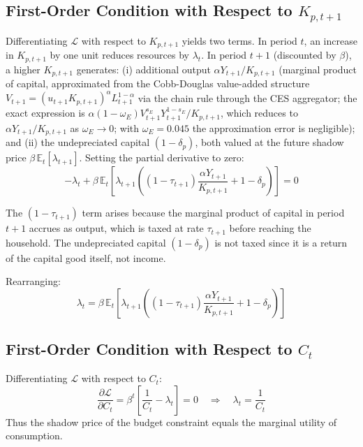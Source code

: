 \documentclass[12pt, a4paper]{article}
\begin{document}
	\subsection*{First-Order Condition with Respect to $K_{p,t+1}$}
	
	Differentiating $\mathcal{L}$ with respect to $K_{p,t+1}$ yields two terms. In period $t$, an increase in $K_{p,t+1}$ by one unit reduces resources by $\lambda_t$. In period $t+1$ (discounted by $\beta$), a higher $K_{p,t+1}$ generates: (i) additional output $\alpha Y_{t+1}/K_{p,t+1}$ (marginal product of capital, approximated from the Cobb-Douglas value-added structure $V_{t+1} = (u_{t+1}K_{p,t+1})^\alpha L_{t+1}^{1-\alpha}$ via the chain rule through the CES aggregator; the exact expression is $\alpha(1-\omega_E)V_{t+1}^{s_E}Y_{t+1}^{1-s_E}/K_{p,t+1}$, which reduces to $\alpha Y_{t+1}/K_{p,t+1}$ as $\omega_E \to 0$; with $\omega_E = 0.045$ the approximation error is negligible); and (ii) the undepreciated capital $(1-\delta_p)$, both valued at the future shadow price $\beta\,\mathbb{E}_t[\lambda_{t+1}]$. Setting the partial derivative to zero:
	\begin{equation*}
		-\lambda_t + \beta\,\mathbb{E}_t\!\left[\lambda_{t+1}
		\left((1-\tau_{t+1})\frac{\alpha Y_{t+1}}{K_{p,t+1}} + 1 - \delta_p\right)\right] = 0
	\end{equation*}
	
	The $(1-\tau_{t+1})$ term arises because the marginal product of capital in period $t+1$ accrues as output, which is taxed at rate $\tau_{t+1}$ before reaching the household. The undepreciated capital $(1-\delta_p)$ is not taxed since it is a return of the capital good itself, not income.
	
	Rearranging:
	\begin{equation*}
		\lambda_t = \beta\,\mathbb{E}_t\!\left[\lambda_{t+1}
		\left((1-\tau_{t+1})\frac{\alpha Y_{t+1}}{K_{p,t+1}} + 1 - \delta_p\right)\right]
		\tag{A1}\label{eq:foc_k}
	\end{equation*}
	
	\subsection*{First-Order Condition with Respect to $C_t$}
	
	Differentiating $\mathcal{L}$ with respect to $C_t$:
	\begin{equation*}
		\frac{\partial \mathcal{L}}{\partial C_t} = \beta^t\left[\frac{1}{C_t} - \lambda_t\right] = 0
		\quad \Longrightarrow \quad
		\lambda_t = \frac{1}{C_t}
		\tag{A2}\label{eq:foc_c}
	\end{equation*}
	Thus the shadow price of the budget constraint equals the marginal utility of consumption.
	
\end{document}

